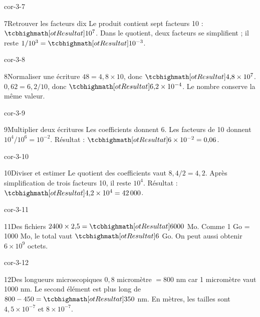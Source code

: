 \begin{blocLivre}{cor-3-7}\begin{corrige}{7}{Retrouver les facteurs dix}
Le produit contient sept facteurs 10 : $\res{10^7}$. Dans le quotient, deux facteurs se simplifient ; il reste $1/10^3=\res{10^{-3}}$.
\end{corrige}\end{blocLivre}
\begin{blocLivre}{cor-3-8}\begin{corrige}{8}{Normaliser une écriture}
$48=4{,}8\times10$, donc $\res{4{,}8\times10^7}$. $0{,}62=6{,}2/10$, donc $\res{6{,}2\times10^{-4}}$. Le nombre conserve la même valeur.
\end{corrige}\end{blocLivre}
\begin{blocLivre}{cor-3-9}\begin{corrige}{9}{Multiplier deux écritures}
Les coefficients donnent 6. Les facteurs de 10 donnent $10^4/10^6=10^{-2}$. Résultat : $\res{6\times10^{-2}=0{,}06}$.
\end{corrige}\end{blocLivre}
\begin{blocLivre}{cor-3-10}\begin{corrige}{10}{Diviser et estimer}
Le quotient des coefficients vaut $8{,}4/2=4{,}2$. Après simplification de trois facteurs 10, il reste $10^4$. Résultat : $\res{4{,}2\times10^4=42\,000}$.
\end{corrige}\end{blocLivre}
\begin{blocLivre}{cor-3-11}\begin{corrige}{11}{Des fichiers}
$2400\times2{,}5=\res{6000}$ Mo. Comme 1 Go = 1000 Mo, le total vaut $\res6$ Go. On peut aussi obtenir $6\times10^9$ octets.
\end{corrige}\end{blocLivre}
\begin{blocLivre}{cor-3-12}\begin{corrige}{12}{Des longueurs microscopiques}
$0{,}8$ micromètre $=800$ nm car 1 micromètre vaut 1000 nm. Le second élément est plus long de $800-450=\res{350}$ nm. En mètres, les tailles sont $4{,}5\times10^{-7}$ et $8\times10^{-7}$.
\end{corrige}\end{blocLivre}
